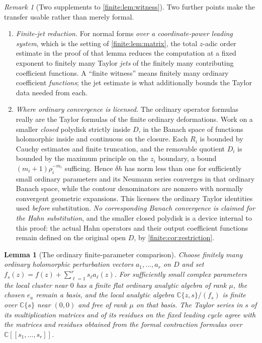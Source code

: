 \documentclass[11pt,letterpaper]{article}
\newtheorem{lemma}[theorem]{Lemma}
\theoremstyle{definition}
\theoremstyle{remark}
\newtheorem{remark}[theorem]{Remark}
\newcommand{\C}{\mathbb C}
\numberwithin{equation}{section}
\begin{document}
\begin{remark}[Two supplements to \cref{finite:lem:witness}]
\label{finite:rem:transfer}
Two further points make the transfer usable rather than merely formal.
\begin{enumerate}
\item \emph{Finite-jet reduction.} For normal forms \emph{over a coordinate-power leading system}, which is the setting of \cref{finite:lem:matrix}, the total $z$-adic order estimate in the proof of that lemma reduces the computation at a fixed exponent to finitely many Taylor \emph{jets} of the finitely many contributing coefficient functions. A ``finite witness'' means finitely many ordinary coefficient \emph{functions}; the jet estimate is what additionally bounds the Taylor data needed from each.
\item \emph{Where ordinary convergence is licensed.} The ordinary operator formulas really are the Taylor formulas of the finite ordinary deformations. Work on a smaller \emph{closed} polydisk strictly inside $D$, in the Banach space of functions holomorphic inside and continuous on the closure. Each $R_i$ is bounded by Cauchy estimates and finite truncation, and the removable quotient $D_i$ is bounded by the maximum principle on the $z_i$ boundary, a bound $(m_i+1)\rho_i^{-m_i}$ sufficing. Hence $\delta h$ has norm less than one for sufficiently small ordinary parameters and its Neumann series converges in that ordinary Banach space, while the contour denominators are nonzero with normally convergent geometric expansions. This licenses the ordinary Taylor identities used \emph{before} substitution. \emph{No corresponding Banach convergence is claimed for the Hahn substitution}, and the smaller closed polydisk is a device internal to this proof: the actual Hahn operators and their output coefficient functions remain defined on the original open $D$, by \cref{finite:cor:restriction}.
\end{enumerate}
\end{remark}

\begin{lemma}[The ordinary finite-parameter comparison]
\label{finite:lem:finitedependence}
Choose finitely many ordinary holomorphic perturbation vectors $a_1,\ldots,a_r$ on $D$ and set $f_s(z)=f(z)+\sum_{\ell=1}^r s_\ell a_\ell(z)$. For sufficiently small complex parameters the local cluster near $0$ has a finite flat ordinary analytic algebra of rank $\mu$, the chosen $e_a$ remain a basis, and the local analytic algebra $\C\{z,s\}/(f_s)$ is finite over $\C\{s\}$ near $(0,0)$ and free of rank $\mu$ on that basis. The Taylor series in $s$ of its multiplication matrices and of its residues on the fixed leading cycle agree with the matrices and residues obtained from the formal contraction formulas over $\C[[s_1,\ldots,s_r]]$.
\end{lemma}
\end{document}
